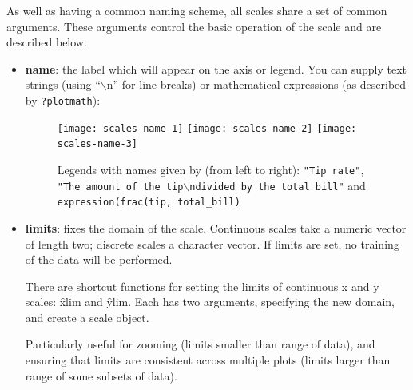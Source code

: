 %

As well as having a common naming scheme, all scales share a set of common arguments.  These arguments control the basic operation of the scale and are described below.

\begin{itemize}
  \item {\bf name}:  the label which will appear on the axis or legend. You can supply text strings (using ``$\backslash$n'' for line breaks) or mathematical expressions (as described by \verb|?plotmath|):
  
  \begin{figure}[htbp]
    \centering
      \texttt{[image: scales-name-1]}%
      \texttt{[image: scales-name-2]}%
      \texttt{[image: scales-name-3]}
    \caption{Legends with names given by (from left to right): {\tt "Tip rate"}, {\tt "The amount of the tip$\backslash$ndivided by the total bill"} and {\tt expression(frac(tip, total\_bill)} }
    \label{fig:legend-names}
  \end{figure}
  

  \item {\bf limits}: fixes the domain of the scale.   Continuous scales take a numeric vector of length two; discrete scales a character vector. If limits are set, no training of the data will be performed.  
  
  There are shortcut functions for setting the limits of continuous x and y scales: \f{xlim} and \f{ylim}.  Each has two arguments, specifying the new domain, and create a scale object.  
  
  Particularly useful for zooming (limits smaller than range of data), and ensuring that limits are consistent across multiple plots (limits larger than range of some subsets of data).  
  

\end{itemize}
